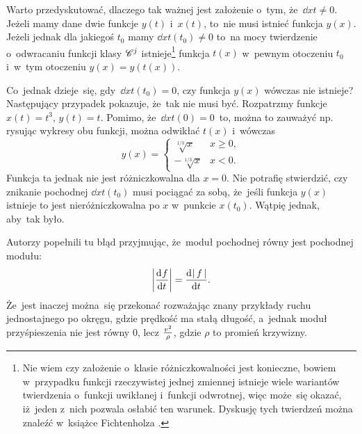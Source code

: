 \documentclass[a4paper,11pt]{article}
\begin{document}

\vspace{\spaceFour}


\start {} Warto przedyskutować, dlaczego tak ważnej jest
założenie o~tym, że~$\dd{}{ x }{ t } \neq 0$. Jeżeli mamy dane dwie
funkcje $y( t )$ i~$x( t )$, to~nie musi istnieć funkcja $y( x )$.
Jeżeli jednak dla jakiegoś $t_{ 0 }$ mamy
$\dd{}{ x }{ t }( t_{ 0 } ) \neq 0$ to~na mocy twierdzenie
o~odwracaniu funkcji klasy $\mathcal{C}^{ j }$ istnieje\footnote{Nie wiem czy
  założenie o~klasie różniczkowalności jest konieczne, bowiem
  w~przypadku funkcji rzeczywistej jednej zmiennej istnieje wiele
  wariantów twierdzenia o~funkcji uwikłanej i~funkcji odwrotnej, więc
  może~się okazać, iż~jeden z~nich pozwala osłabić ten warunek.
  Dyskusję tych twierdzeń można znaleźć w~książce Fichtenholza
  \cite{Fic05a}.} funkcja $t( x )$ w~pewnym otoczeniu $t_{ 0 }$
i~w~tym otoczeniu $y( x ) = y( t( x ) )$.

Co~jednak dzieje~się, gdy~$\dd{}{ x }{ t }( t_{ 0 } ) = 0$, czy
funkcja $y( x )$ wówczas nie istnieje? Następujący przypadek pokazuje,
że~tak nie musi być. Rozpatrzmy funkcje $x( t ) = t^{ 3 }$,
$y( t ) = t$. Pomimo, że~$\dd{}{ x }{ t }( 0 ) = 0$~to, można to
zauważyć np. rysując wykresy obu funkcji, można odwikłać $t( x )$
i~wówczas
\begin{equation*}
  y( x ) =
  \begin{cases}
    \sqrt[1 / 3]{ x } & x \geq 0, \\
    -\sqrt[1 / 3]{ x } & x < 0.
  \end{cases}
\end{equation*}
Funkcja ta jednak nie jest różniczkowalna dla $x = 0$. Nie potrafię
stwierdzić, czy znikanie pochodnej $\dd{}{ x }{ t }( t_{ 0 } )$ musi
pociągać za sobą, że~jeśli funkcja $y( x )$ istnieje to jest
nieróżniczkowalna po $x$ w~punkcie $x( t_{ 0 } )$. Wątpię jednak,
aby~tak było.

\vspace{\spaceFour}


\start {} Autorzy popełnili tu błąd przyjmując, że~moduł
pochodnej równy jest pochodnej modułu:
\begin{equation*}
  \left| \frac{ \mathrm{d}^{  } {  f  } }{ \mathrm{d} {  t  }^{  } } \right| = \frac{ \mathrm{d}^{  } {  \left| \,  f  \, \right|  } }{ \mathrm{d} {  t  }^{  } }.
\end{equation*}
Że~jest inaczej można~się przekonać rozważając znany przykłady ruchu
jednostajnego po okręgu, gdzie prędkość ma stałą długość, a~jednak
moduł przyśpieszenia nie jest równy 0, lecz $\frac{ v^{ 2 } }{ \rho }$,
gdzie $\rho$ to promień krzywizny.
\end{document}
